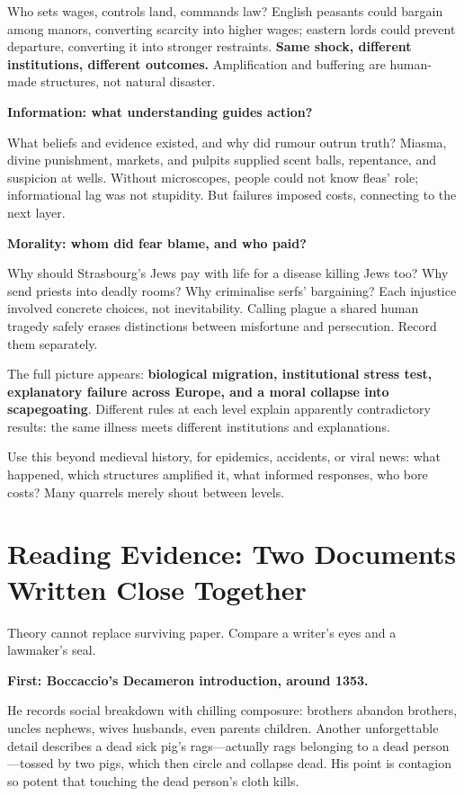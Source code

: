 Who sets wages, controls land, commands law? English peasants could bargain among manors, converting scarcity into higher wages; eastern lords could prevent departure, converting it into stronger restraints. \textbf{Same shock, different institutions, different outcomes.} Amplification and buffering are human-made structures, not natural disaster.

\textbf{Information: what understanding guides action?}

What beliefs and evidence existed, and why did rumour outrun truth? Miasma, divine punishment, markets, and pulpits supplied scent balls, repentance, and suspicion at wells. Without microscopes, people could not know fleas' role; informational lag was not stupidity. But failures imposed costs, connecting to the next layer.

\textbf{Morality: whom did fear blame, and who paid?}

Why should Strasbourg's Jews pay with life for a disease killing Jews too? Why send priests into deadly rooms? Why criminalise serfs' bargaining? Each injustice involved concrete choices, not inevitability. Calling plague a shared human tragedy safely erases distinctions between misfortune and persecution. Record them separately.

The full picture appears: \textbf{biological migration, institutional stress test, explanatory failure across Europe, and a moral collapse into scapegoating}. Different rules at each level explain apparently contradictory results: the same illness meets different institutions and explanations.

Use this beyond medieval history, for epidemics, accidents, or viral news: what happened, which structures amplified it, what informed responses, who bore costs? Many quarrels merely shout between levels.

\section[Two Nearby Documents]{Reading Evidence: Two Documents Written Close Together}
Theory cannot replace surviving paper. Compare a writer's eyes and a lawmaker's seal.

\textbf{First: Boccaccio's Decameron introduction, around 1353.}

He records social breakdown with chilling composure: brothers abandon brothers, uncles nephews, wives husbands, even parents children. Another unforgettable detail describes a dead sick pig's rags---actually rags belonging to a dead person---tossed by two pigs, which then circle and collapse dead. His point is contagion so potent that touching the dead person's cloth kills.

